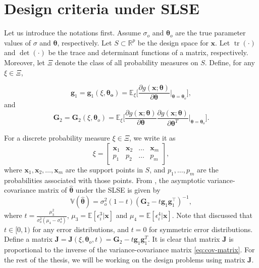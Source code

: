 \documentclass[
]{book}
\theoremstyle{definition}
\theoremstyle{definition}
\theoremstyle{definition}
\theoremstyle{definition}
\theoremstyle{remark}
\begin{document}
\hypertarget{design-criteria-under-slse}{%
\section{Design criteria under SLSE}\label{design-criteria-under-slse}}

Let us introduce the notations first. Assume \(\sigma_o\) and \(\boldsymbol{\theta}_o\) are the true parameter values of \(\sigma\) and \(\boldsymbol{\theta}\), respectively. Let \(S \subset \mathbb{R}^p\) be the design space for \(\boldsymbol{x}\). Let \(\operatorname{tr}(\cdot)\) and \(\operatorname{det}(\cdot)\) be the trace and determinant functions of a matrix, respectively. Moreover, let \(\Xi\) denote the class of all probability measures on \(S\). Define, for any \(\xi\in \Xi\),

\begin{equation*}
\boldsymbol{g}_1=\boldsymbol{g}_1(\xi,\boldsymbol{\theta_o})=\mathbb{E}_{\xi}\bigg[ \frac{\partial g(\boldsymbol{x};\boldsymbol{\theta})}{\partial \boldsymbol{\theta}}\Big|_{\boldsymbol{\theta}=\boldsymbol{\theta}_o} \bigg],
\end{equation*}
and
\begin{equation*}
\boldsymbol{G}_2=\boldsymbol{G}_2(\xi,\boldsymbol{\theta}_o)=\mathbb{E}_{\xi} \bigg[ \frac{\partial g(\boldsymbol{x};\boldsymbol{\theta})}{\partial \boldsymbol{\theta}}\frac{\partial g(\boldsymbol{x};\boldsymbol{\theta})}{\partial \boldsymbol{\theta}^T}\Big|_{\boldsymbol{\theta}=\boldsymbol{\theta}_o}\bigg].
\end{equation*}

For a discrete probability measure \(\xi\in \Xi\), we write it as
\[
\xi=\begin{bmatrix}
    \boldsymbol{x}_1&\boldsymbol{x}_2   &\ldots &\boldsymbol{x}_m\\
    p_1     &p_2        &\ldots &p_m
\end{bmatrix},
\]
where \(\boldsymbol{x}_1,\boldsymbol{x}_2,\dots,\boldsymbol{x}_m\) are the support points in \(S\), and \(p_1,\dots,p_m\) are the probabilities associated with those points. From \citet{gao2014new}, the asymptotic variance-covariance matrix of \(\hat{\boldsymbol{\theta}}\) under the SLSE is given by
\begin{equation}
\boldsymbol{\mathbb{V}}({\boldsymbol{\hat{\theta}}})=\sigma^2_o(1-t)(\boldsymbol{G}_2-t\boldsymbol{g}_1\boldsymbol{g}_1^\top)^{-1},
\label{eq:cov-matrix}
\end{equation}
where \(t=\frac{\mu_3^2}{\sigma_o^2(\mu_4-\sigma_o^4)}\), \(\mu_3=\mathbb{E}[\epsilon_i^3|\boldsymbol{x}]\) and \(\mu_4=\mathbb{E}[\epsilon_i^4|\boldsymbol{x}]\). Note that \citet{gao2014new} discussed that \(t \in [0,1)\) for any error distributions, and \(t=0\) for symmetric error distributions. Define a matrix \(\boldsymbol{J}=\boldsymbol{J}(\xi,\boldsymbol{\theta}_o,t) = \boldsymbol{G}_2-t\boldsymbol{g}_1\boldsymbol{g}_1^T\). It is clear that matrix \(\boldsymbol{J}\) is proportional to the inverse of the variance-covariance matrix \eqref{eq:cov-matrix}. For the rest of the thesis, we will be working on the design problems using matrix \(\boldsymbol{J}\).
\end{document}
